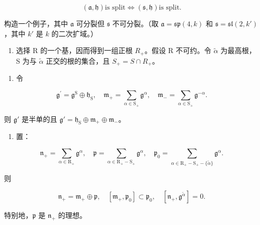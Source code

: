\[
(\mathfrak {a}, \mathfrak {h}) \text {is split} \Longleftrightarrow (\mathfrak {s}, \mathfrak {h}) \text {is split.}
\]

构造一个例子，其中 \(\mathfrak{a}\) 可分裂但 \(\mathfrak{s}\) 不可分裂。（取 \(\mathfrak{a} = \mathfrak{sp}(4, k)\) 和 \(\mathfrak{s} = \mathfrak{sl}(2, k')\)，其中 \(k'\) 是 \(k\) 的二次扩域。）

\begin{enumerate}
\def\labelenumi{\arabic{enumi})}
\setcounter{enumi}{7}
\tightlist
\item
  选择 R 的一个基，因而得到一组正根 \(R_{+}\)。假设 R 不可约。令 \(\tilde{\alpha}\) 为最高根，S 为与 \(\tilde{\alpha}\) 正交的根的集合，且 \(S_{+} = S \cap R_{+}\)。
\end{enumerate}

\begin{enumerate}
\def\labelenumi{\alph{enumi})}
\tightlist
\item
  令
\end{enumerate}

\[
\mathfrak {g} ^ {\prime} = \mathfrak {g} ^ {\mathrm{S}} \oplus \mathfrak {h} _ {\mathrm{S}}, \quad \mathfrak {m} _ {+} = \sum_ {\alpha \in \mathrm{S} _ {+}} \mathfrak {g} ^ {\alpha}, \quad \mathfrak {m} _ {-} = \sum_ {\alpha \in \mathrm{S} _ {+}} \mathfrak {g} ^ {- \alpha}.
\]

则 \(\mathfrak{g}'\) 是半单的且 \(\mathfrak{g}' = \mathfrak{h}_{\mathrm{S}} \oplus \mathfrak{m}_{+} \oplus \mathfrak{m}_{-}\)。

\begin{enumerate}
\def\labelenumi{\alph{enumi})}
\setcounter{enumi}{1}
\tightlist
\item
  置：
\end{enumerate}

\[
\mathfrak {n} _ {+} = \sum_ {\alpha \in \mathrm{R} _ {+}} \mathfrak {g} ^ {\alpha}, \quad \mathfrak {p} = \sum_ {\alpha \in \mathrm{R} _ {+} - \mathrm{S} _ {+}} \mathfrak {g} ^ {\alpha}, \quad \mathfrak {p} _ {0} = \sum_ {\alpha \in \mathrm{R} _ {+} - \mathrm{S} _ {+} - \{\tilde {\alpha} \}} \mathfrak {g} ^ {\alpha}.
\]

则

\[
\mathfrak {n} _ {+} = \mathfrak {m} _ {+} \oplus \mathfrak {p}, \quad [ \mathfrak {m} _ {+}, \mathfrak {p} _ {0} ] \subset \mathfrak {p} _ {0}, \quad [ \mathfrak {n} _ {+}, \mathfrak {g} ^ {\tilde {\alpha}} ] = 0.
\]

特别地，\(\mathfrak{p}\) 是 \(\mathfrak{n}_{+}\) 的理想。

